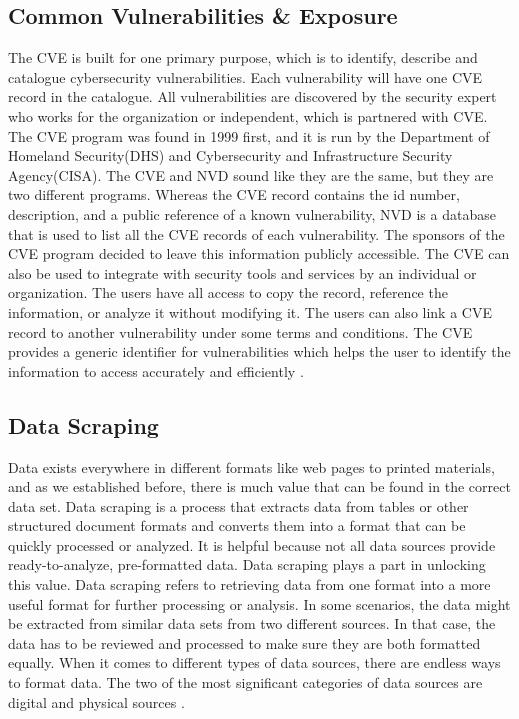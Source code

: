 \subsection{Common Vulnerabilities \& Exposure}
The \acs{CVE} is built for one primary purpose, which is to identify, describe and catalogue cybersecurity vulnerabilities. Each vulnerability will have one \acs{CVE} record in the catalogue. All vulnerabilities are discovered by the security expert who works for the organization or independent, which is partnered with \acs{CVE}. The \acs{CVE} program was found in 1999 first, and it is run by the Department of Homeland Security(DHS) and Cybersecurity and Infrastructure Security Agency(CISA). The \acs{CVE} and \acs{NVD} sound like they are the same, but they are two different programs. Whereas the \acs{CVE} record contains the id number, description, and a public reference of a known vulnerability, \acs{NVD} is a database that is used to list all the \acs{CVE} records of each vulnerability. The sponsors of the \acs{CVE} program decided to leave this information publicly accessible. The \acs{CVE} can also be used to integrate with security tools and services by an individual or organization. The users have all access to copy the record, reference the information, or analyze it without modifying it. The users can also link a \acs{CVE} record to another vulnerability under some terms and conditions. The \acs{CVE} provides a generic identifier for vulnerabilities which helps the user to identify the information to access accurately and efficiently \cite{cve}. 
%

\subsection{Data Scraping}
Data exists everywhere in different formats like web pages to printed materials, and as we established before, there is much value that can be found in the correct data set. Data scraping is a process that extracts data from tables or other structured document formats and converts them into a format that can be quickly processed or analyzed. It is helpful because not all data sources provide ready-to-analyze, pre-formatted data. Data scraping plays a part in unlocking this value. Data scraping refers to retrieving data from one format into a more useful format for further processing or analysis. In some scenarios, the data might be extracted from similar data sets from two different sources. In that case, the data has to be reviewed and processed to make sure they are both formatted equally. When it comes to different types of data sources, there are endless ways to format data. The two of the most significant categories of data sources are digital and physical sources \cite{NaJaMa2018}.

